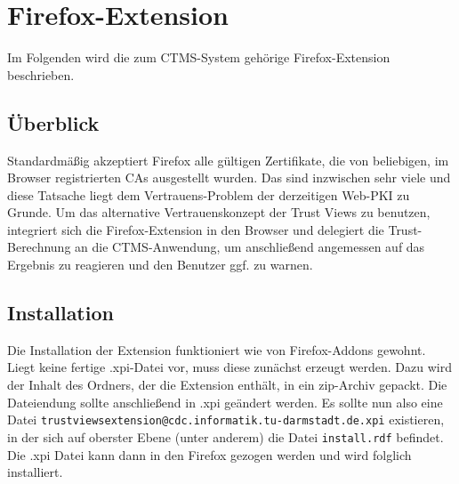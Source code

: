 \documentclass[accentcolor=tud1c,article,colorback,11pt]{tudreport}
\begin{document}
\section{Firefox-Extension}
Im Folgenden wird die zum CTMS-System gehörige Firefox-Extension beschrieben.

\subsection{Überblick}
Standardmäßig akzeptiert Firefox alle gültigen Zertifikate, die von beliebigen, im Browser registrierten CAs ausgestellt wurden. Das sind inzwischen sehr viele und diese Tatsache liegt dem Vertrauens-Problem der derzeitigen Web-PKI zu Grunde. Um das alternative Vertrauenskonzept der Trust Views zu benutzen, integriert sich die Firefox-Extension in den Browser und delegiert die Trust-Berechnung an die CTMS-Anwendung, um anschließend angemessen auf das Ergebnis zu reagieren und den Benutzer ggf. zu warnen.

\subsection{Installation}
Die Installation der Extension funktioniert wie von Firefox-Addons gewohnt. Liegt keine fertige .xpi-Datei vor, muss diese zunächst erzeugt werden. Dazu wird der Inhalt des Ordners, der die Extension enthält, in ein zip-Archiv gepackt. Die Dateiendung sollte anschließend in .xpi geändert werden. Es sollte nun also eine Datei \texttt{trustviewsextension@cdc.informatik.tu-darmstadt.de.xpi} existieren, in der sich auf oberster Ebene (unter anderem) die Datei \texttt{install.rdf} befindet. Die .xpi Datei kann dann in den Firefox gezogen werden und wird folglich installiert.
\end{document}

